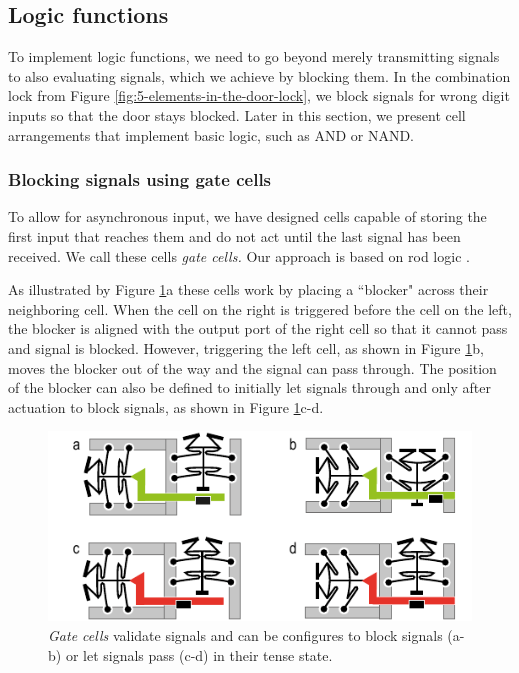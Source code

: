 \subsection{Logic functions}

To implement logic functions, we need to go beyond merely transmitting signals to also evaluating signals, which we achieve by blocking them. In the combination lock from Figure \ref{fig:5-elements-in-the-door-lock}, we block signals for wrong digit inputs so that the door stays blocked. Later in this section, we present cell arrangements that implement basic logic, such as AND or NAND.

\subsubsection{Blocking signals using gate cells}

To allow for asynchronous input, we have designed cells capable of storing the first input that reaches them and do not act until the last signal has been received. We call these cells \textit{gate cells.} Our approach is based on rod logic \cite{Merkle1993}. 

As illustrated by Figure \ref{fig:13-gate-cells-illustration}a these cells work by placing a ``blocker" across their neighboring cell. When the cell on the right is triggered before the cell on the left, the blocker is aligned with the output port of the right cell so that it cannot pass and signal is blocked. However, triggering the left cell, as shown in Figure \ref{fig:13-gate-cells-illustration}b, moves the blocker out of the way and the signal can pass through. The position of the blocker can also be defined to initially let signals through and only after actuation to block signals, as shown in Figure \ref{fig:13-gate-cells-illustration}c-d.

\begin{figure} [h]  
    \includegraphics[width=\textwidth]{chapters/digital-metamaterials-FIG/13-gate-cells-illustration.pdf}
    \caption[Short figure name.]{\textit{Gate cells} validate signals and can be configures to block signals (a-b) or let signals pass (c-d) in their tense state.
    \label{fig:13-gate-cells-illustration}}
\end{figure}

